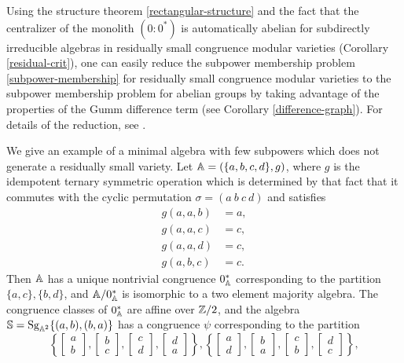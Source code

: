 \documentclass[letterpaper,11pt]{article}
\DeclareMathOperator{\Sg}{Sg}
\begin{document}
\begin{rem} Using the structure theorem \ref{rectangular-structure} and the fact that the centralizer of the monolith $(0:0^*)$ is automatically abelian for subdirectly irreducible algebras in residually small congruence modular varieties (Corollary \ref{residual-crit}), one can easily reduce the subpower membership problem \ref{subpower-membership} for residually small congruence modular varieties to the subpower membership problem for abelian groups by taking advantage of the properties of the Gumm difference term (see Corollary \ref{difference-graph}). For details of the reduction, see \cite{subpower-residually-small}.
\end{rem}

\begin{ex} We give an example of a minimal algebra with few subpowers which does not generate a residually small variety. Let $\mathbb{A} = (\{a,b,c,d\}, g)$, where $g$ is the idempotent ternary symmetric operation which is determined by that fact that it commutes with the cyclic permutation $\sigma = (a\ b\ c\ d)$ and satisfies
\begin{align*}
g(a,a,b) &= a,\\
g(a,a,c) &= c,\\
g(a,a,d) &= c,\\
g(a,b,c) &= c.%
\end{align*}
Then $\mathbb{A}$ has a unique nontrivial congruence $0^*_{\mathbb{A}}$ corresponding to the partition $\{a,c\},\{b,d\}$, and $\mathbb{A}/0^*_{\mathbb{A}}$ is isomorphic to a two element majority algebra. The congruence classes of $0^*_{\mathbb{A}}$ are affine over $\mathbb{Z}/2$, and the algebra $\bS = \Sg_{\bA^2}\{(a,b),(b,a)\}$ has a congruence $\psi$ corresponding to the partition
\[
\left\{\begin{bmatrix} a\\ b\end{bmatrix},\begin{bmatrix} b\\ c\end{bmatrix},\begin{bmatrix} c\\ d\end{bmatrix}, \begin{bmatrix} d\\ a\end{bmatrix}\right\}, \left\{\begin{bmatrix} a\\ d\end{bmatrix},\begin{bmatrix} b\\ a\end{bmatrix},\begin{bmatrix} c\\ b\end{bmatrix}, \begin{bmatrix} d\\ c\end{bmatrix}\right\},
\]
\end{ex}
\end{document}
